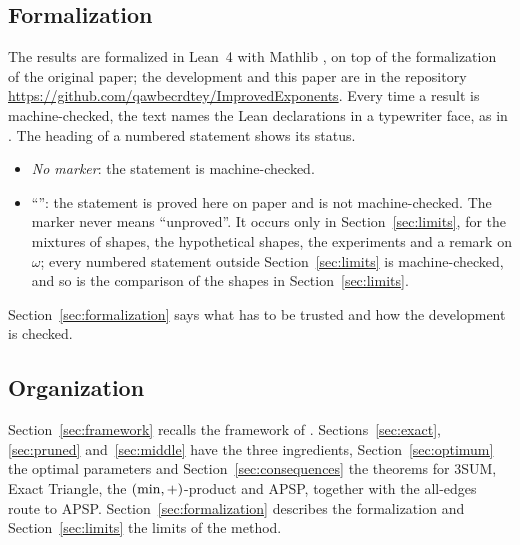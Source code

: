 \subsection*{Formalization}

The results are formalized in Lean~4 \cite{Lean4} with Mathlib \cite{Mathlib},
on top of the formalization \cite{upstream} of the original paper; the
development and this paper are in the repository
\url{https://github.com/qawbecrdtey/ImprovedExponents}.  Every time
a result is machine-checked, the text names the Lean declarations in a
typewriter face, as in .  The heading of a numbered
statement shows its status.
\begin{itemize}
\item \emph{No marker}: the statement is machine-checked.
\item ``\nf'': the statement is proved here on paper and is not
  machine-checked.  The marker never means ``unproved''.  It occurs only in
  Section~\ref{sec:limits}, for the mixtures of shapes, the hypothetical
  shapes, the experiments and a remark on \(\omega\); every numbered statement
  outside Section~\ref{sec:limits} is machine-checked, and so is the
  comparison of the shapes in Section~\ref{sec:limits}.
\end{itemize}
Section~\ref{sec:formalization} says what has to be trusted and how the
development is checked.

\subsection*{Organization}

Section~\ref{sec:framework} recalls the framework of \cite{AV}.
Sections~\ref{sec:exact}, \ref{sec:pruned} and~\ref{sec:middle} have the three
ingredients, Section~\ref{sec:optimum} the optimal parameters and
Section~\ref{sec:consequences} the theorems for 3SUM, Exact Triangle, the
\((\min,+)\)-product and APSP, together with the all-edges route to APSP.
Section~\ref{sec:formalization} describes the formalization and
Section~\ref{sec:limits} the limits of the method.

